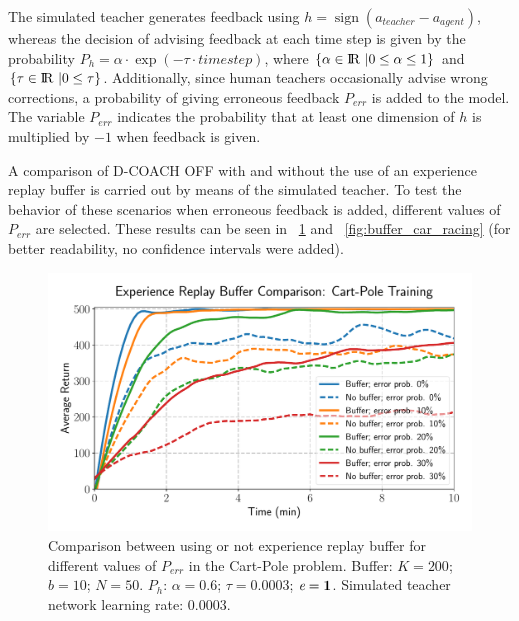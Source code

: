 The simulated teacher generates feedback using $h = \operatorname{sign}(a_{\mathit{teacher}} - a_{\mathit{agent}})$, whereas the decision of advising feedback at each time step is given by the probability $P_{h} = \alpha \cdot\exp(-\tau\cdot \mathit{timestep})$, where $\{\alpha \in {\rm I\!R}\ | 0 \le \alpha \le 1\}$ and $\{\tau \in {\rm I\!R}\ | 0 \le \tau\}$. Additionally, since human teachers occasionally advise wrong corrections, a probability of giving erroneous feedback $P_{\mathit{err}}$ is added to the model. The variable $P_{\mathit{err}}$ indicates the probability that at least one dimension of $h$ is multiplied by $-1$ when feedback is given.

A comparison of D-COACH OFF with and without the use of an experience replay buffer is carried out by means of the simulated teacher. To test the behavior of these scenarios when erroneous feedback is added, different values of $P_{\mathit{err}}$ are selected. These results can be seen in \figurename~{\ref{fig:buffer_cart_pole}} and \figurename~{\ref{fig:buffer_car_racing}} (for better readability, no confidence intervals were added).

\begin{figure}[H]
    \centering
    \includegraphics[width=0.66\linewidth]{imagenes/cap3/buffer_cart_pole.pdf}
    \caption[Comparison between using or not experience replay buffer for different values of $P_\mathit{err}$ in the Cart-Pole problem.]{Comparison between using or not experience replay buffer for different values of $P_\mathit{err}$ in the Cart-Pole problem. Buffer: $K = 200$; $b = 10$; $N = 50$. $P_{h}$: $\alpha = 0.6$; $\tau = 0.0003$; $\emph{e}=\textbf{1}$. Simulated teacher network learning rate: $0.0003$.}
    \label{fig:buffer_cart_pole}
\end{figure}

